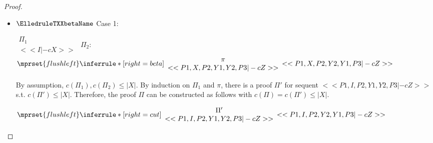 \begin{proof}
\begin{enumerate}
\begin{itemize}
    \item $\ElledruleTXXbetaName$ Case 1:
      \begin{center}
        \scriptsize
        \begin{math}
          \begin{array}{c}
            \Pi_1 \\
            {<<I |-c X>>}
          \end{array}
        \end{math}
        \qquad\qquad
        $\Pi_2$:
        \begin{math}
          $$\mprset{flushleft}
          \inferrule* [right={\tiny beta}] {
            {
              \begin{array}{c}
                \pi \\
                {<<P1, X, P2, Y1, Y2, P3 |-c Z>>}
              \end{array}
            }
          }{<<P1, X, P2, Y2, Y1, P3 |-c Z>>}
        \end{math}
      \end{center}
      By assumption, $c(\Pi_1),c(\Pi_2)\leq |X|$. By induction on $\Pi_1$ and $\pi$, there is
      a proof $\Pi'$ for sequent $<<P1, I, P2, Y1, Y2, P3 |-c Z>>$ s.t. $c(\Pi') \leq |X|$.
      Therefore, the proof $\Pi$ can be constructed as follows with
      $c(\Pi) = c(\Pi') \leq |X|$.
      \begin{center}
        \scriptsize
        \begin{math}
          $$\mprset{flushleft}
          \inferrule* [right={\tiny cut}] {
            {
              \begin{array}{cc}
                \Pi' \\
                {<<P1, I, P2, Y1, Y2, P3 |-c Z>>}
              \end{array}
            }
          }{<<P1, I, P2, Y2, Y1, P3 |-c Z>>}
        \end{math}
      \end{center}


\end{itemize}
\end{enumerate}
\end{proof}
